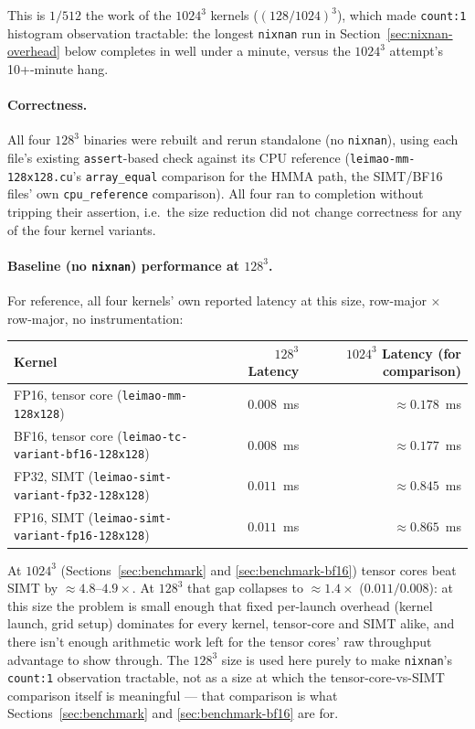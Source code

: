 \documentclass[11pt]{article}
\begin{document}
This is $1/512$ the work of the $1024^3$ kernels ($(128/1024)^3$), which made
\texttt{count:1} histogram observation tractable: the longest \texttt{nixnan} run in
Section~\ref{sec:nixnan-overhead} below completes in well under a minute, versus the
$1024^3$ attempt's 10+-minute hang.

\paragraph{Correctness.} All four $128^3$ binaries were rebuilt and rerun standalone (no
\texttt{nixnan}), using each file's existing \texttt{assert}-based check against its CPU
reference (\texttt{leimao-mm-128x128.cu}'s \texttt{array\_equal} comparison for the HMMA
path, the SIMT/BF16 files' own \texttt{cpu\_reference} comparison). All four ran to
completion without tripping their assertion, i.e.\ the size reduction did not change
correctness for any of the four kernel variants.

\paragraph{Baseline (no \texttt{nixnan}) performance at $128^3$.} For reference, all four
kernels' own reported latency at this size, row-major $\times$ row-major, no
instrumentation:

\begin{center}
\small
\begin{tabular}{lrr}
\toprule
Kernel & $128^3$ Latency & $1024^3$ Latency (for comparison) \\
\midrule
FP16, tensor core (\texttt{leimao-mm-128x128}) & $0.008$~ms & $\approx 0.178$~ms \\
BF16, tensor core (\texttt{leimao-tc-variant-bf16-128x128}) & $0.008$~ms & $\approx 0.177$~ms \\
FP32, SIMT (\texttt{leimao-simt-variant-fp32-128x128}) & $0.011$~ms & $\approx 0.845$~ms \\
FP16, SIMT (\texttt{leimao-simt-variant-fp16-128x128}) & $0.011$~ms & $\approx 0.865$~ms \\
\bottomrule
\end{tabular}
\end{center}

At $1024^3$ (Sections~\ref{sec:benchmark} and \ref{sec:benchmark-bf16}) tensor cores beat
SIMT by $\approx\!4.8$--$4.9\times$. At $128^3$ that gap collapses to
$\approx\!1.4\times$ ($0.011/0.008$): at this size the problem is small enough that fixed
per-launch overhead (kernel launch, grid setup) dominates for every kernel, tensor-core
and SIMT alike, and there isn't enough arithmetic work left for the tensor cores' raw
throughput advantage to show through. The $128^3$ size is used here purely to make
\texttt{nixnan}'s \texttt{count:1} observation tractable, not as a size at which the
tensor-core-vs-SIMT comparison itself is meaningful --- that comparison is what
Sections~\ref{sec:benchmark} and \ref{sec:benchmark-bf16} are for.
\end{document}
